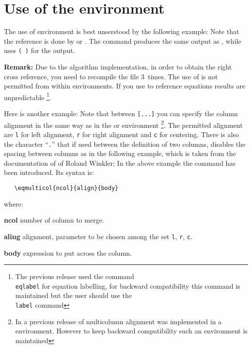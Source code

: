 \documentclass[a4paper,final,11pt]{article}
\begin{document}
\section{Use of the  environment}
The use of  environment is best unserstood by the following
example:
Note that the reference is done by  or . 
The command  produces the same output as ,
while  uses \texttt{( )} for the output.

\textbf{Remark:} Due to the algorithm implementation,
in order to obtain the right cross reference, you need
to recompile the file 3~times.  The use of
 is not permitted from within  environments.
If you use  to reference equations results
are unpredictable%
\footnote{%
The previous release used the command
\texttt{\\eqlabel} for equation labelling,
for backward compatibility this command
is maintained but the user should use the \texttt{\\label}
command
}.

Here is another example:
Note that between \verb|[...]| you can specify the column alignment
in the same way as in the  or  
environment%
\footnote{In a previous release of 
multicolumn alignment was implemented in a  environment.
However to keep backward compatibility such an environment
is maintained}.
The permitted alignment are \verb|l| for left alignment,
\verb|r| for right alignment and \verb|c| for centering. There is also
the character ``\verb'.''' that if used between the definition of two columns,
disables the spacing between columns as in the following example, which is
taken from the documentation of  of Roland Winkler;
In the above example the command  has been introduced.
Its syntax is:
\begin{verbatim}
   \eqmulticol{ncol}{align}{body}
\end{verbatim}
where:
\begin{dotlist}
  \item[\textbf{ncol}]  number of column to merge.
  \item[\textbf{aling}] alignment, parameter to be chosen among the set 
                        \verb'l',  \verb'r',  \verb'c'.
  \item[\textbf{body}] expression to put across the column.
\end{dotlist}
\end{document}
